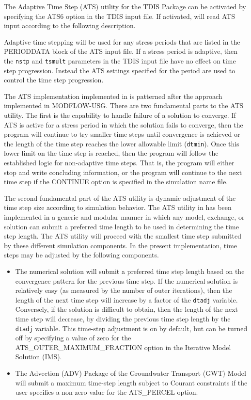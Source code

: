 The Adaptive Time Step (ATS) utility for the TDIS Package can be activated by specifying the ATS6 option in the TDIS input file.  If activated, \mf will read ATS input according to the following description.

Adaptive time stepping will be used for any stress periods that are listed in the PERIODDATA block of the ATS input file.  If a stress period is adaptive, then the \texttt{nstp} and \texttt{tsmult} parameters in the TDIS input file have no effect on time step progression.  Instead the ATS settings specified for the period are used to control the time step progression.

The ATS implementation implemented in \mf is patterned after the approach implemented in MODFLOW-USG.  There are two fundamental parts to the ATS utility.  The first is the capability to handle failure of a solution to converge.  If ATS is active for a stress period in which the solution fails to converge, then the program will continue to try smaller time steps until convergence is achieved or the length of the time step reaches the lower allowable limit (\texttt{dtmin}).  Once this lower limit on the time step is reached, then the program will follow the established logic for non-adaptive time steps.  That is, the program will either stop and write concluding information, or the program will continue to the next time step if the CONTINUE option is specified in the simulation name file.

The second fundamental part of the ATS utility is dynamic adjustment of the time step size according to simulation behavior.  The ATS utility in \mf has been implemented in a generic and modular manner in which any model, exchange, or solution can submit a preferred time length to be used in determining the time step length.  The ATS utility will proceed with the smallest time step submitted by these different simulation components.  In the present implementation, time steps may be adjusted by the following components.

\begin{itemize}
\item The numerical solution will submit a preferred time step length based on the convergence pattern for the previous time step.  If the numerical solution is relatively easy (as measured by the number of outer iterations), then the length of the next time step will increase by a factor of the \texttt{dtadj} variable.  Conversely, if the solution is difficult to obtain, then the length of the next time step will decrease, by dividing the previous time step length by the \texttt{dtadj} variable.  This time-step adjustment is on by default, but can be turned off by specifying a value of zero for the ATS\_OUTER\_MAXIMUM\_FRACTION option in the Iterative Model Solution (IMS).

\item The Advection (ADV) Package of the Groundwater Transport (GWT) Model will submit a maximum time-step length subject to Courant constraints if the user specifies a non-zero value for the ATS\_PERCEL option.
\end{itemize}

